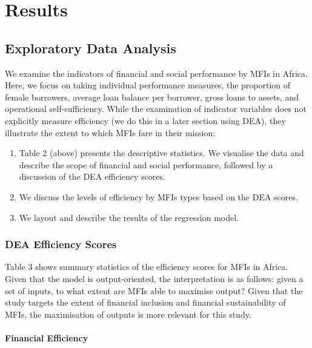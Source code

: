 \documentclass[
]{article}
\providecommand{\tightlist}{%
  \setlength{\itemsep}{0pt}\setlength{\parskip}{0pt}}
\begin{document}
\hypertarget{results}{%
\section{Results}\label{results}}

\hypertarget{exploratory-data-analysis}{%
\subsection{Exploratory Data Analysis}\label{exploratory-data-analysis}}

We examine the indicators of financial and social performance by MFIs in
Africa. Here, we focus on taking individual performance measures, the
proportion of female borrowers, average loan balance per borrower, gross
loans to assets, and operational self-sufficiency. While the examination
of indicator variables does not explicitly measure efficiency (we do
this in a later section using DEA), they illustrate the extent to which
MFIs fare in their mission:

\begin{enumerate}
\def\labelenumi{\arabic{enumi}.}
\tightlist
\item
  Table 2 (above) presents the descriptive statistics. We visualise the
  data and describe the scope of financial and social performance,
  followed by a discussion of the DEA efficiency scores.
\item
  We discuss the levels of efficiency by MFIs types based on the DEA
  scores.
\item
  We layout and describe the results of the regression model.
\end{enumerate}

\hypertarget{dea-efficiency-scores}{%
\subsubsection{DEA Efficiency Scores}\label{dea-efficiency-scores}}

Table 3 shows summary statistics of the efficiency scores for MFIs in
Africa. Given that the model is output-oriented, the interpretation is
as follows: given a set of inputs, to what extent are MFIs able to
maximise output? Given that the study targets the extent of financial
inclusion and financial sustainability of MFIs, the maximisation of
outputs is more relevant for this study.

\hypertarget{financial-efficiency-1}{%
\paragraph{Financial Efficiency}\label{financial-efficiency-1}}
\end{document}
